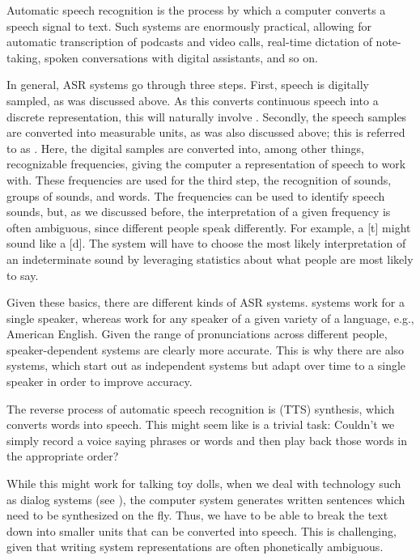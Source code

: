 Automatic speech recognition is the process by which a computer
converts a speech signal to text.  Such systems are enormously
practical, allowing for automatic transcription of podcasts and video calls, real-time dictation of note-taking, spoken conversations with digital assistants, and so on.

In general, ASR systems go through three steps.  First, speech is
digitally sampled, as was discussed above.  As this converts
continuous speech into a discrete representation, this will naturally
involve .  Secondly, the speech samples are
converted into measurable units, as was also discussed above; this is
referred to as .  Here, the
digital samples are converted into, among other things, recognizable
frequencies, giving the computer a representation of speech to work
with.  These frequencies are used for the third step, the recognition
of sounds, groups of sounds, and words.  The frequencies can be used
to identify speech sounds, but, as we discussed before, the
interpretation of a given frequency is often ambiguous, since
different people speak differently.  For example, a {[t]}
might sound like a {[d]}.  The system will have to choose the most likely interpretation of an indeterminate sound by leveraging statistics about what people are most likely to say.


Given these basics, there are different kinds of ASR systems.  
 systems work for a
single speaker, whereas  work for any
speaker of a given variety of a language, e.g., American English.
Given the range of pronunciations across different people,
speaker-dependent systems are clearly more accurate.  This is why
there are also  systems, which start out as
independent systems but adapt over time to a single speaker in order to
improve accuracy.


The reverse process of automatic speech recognition is 
(TTS) synthesis, which converts words into speech.  This might seem
like is a trivial task: Couldn't we simply record a voice saying
phrases or words and then play back those words in the appropriate
order?

While this might work for talking toy dolls, when we deal with
technology such as dialog systems (see ), the computer system generates
written sentences which need to be synthesized on the fly.  Thus, we
have to be able to break the text down into smaller units that can be
converted into speech.  This is challenging, given that writing system
representations are often phonetically ambiguous.

